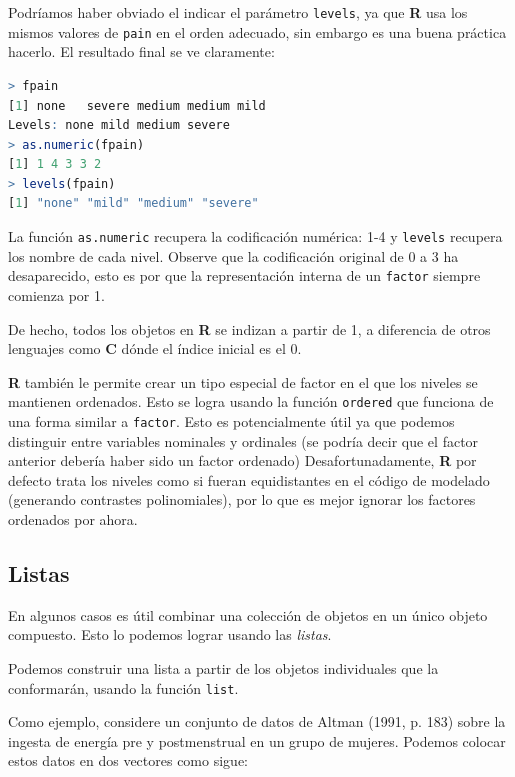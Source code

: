 Podríamos haber obviado el indicar el parámetro \texttt{levels}, ya que \textbf{R} usa
los mismos valores de \texttt{pain} en el orden adecuado, sin embargo es una buena
práctica hacerlo. El resultado final se ve claramente:

\begin{lstlisting}[language=R]
> fpain
[1] none   severe medium medium mild
Levels: none mild medium severe
> as.numeric(fpain)
[1] 1 4 3 3 2
> levels(fpain)
[1] "none" "mild" "medium" "severe"
\end{lstlisting}

La función \texttt{as.numeric} recupera la codificación numérica: 1-4 y
\texttt{levels} recupera los nombre de cada nivel. Observe que la codificación
original de 0 a 3 ha desaparecido, esto es por que la representación interna de
un \texttt{factor} siempre comienza por 1.

\begin{tradnote} De hecho, todos los objetos en \textbf{R} se indizan a partir de 1, a
diferencia de otros lenguajes como \textbf{C} dónde el índice inicial es el
0.\end{tradnote}

\textbf{R} también le permite crear un tipo especial de factor en el que los
niveles se mantienen ordenados.  Esto se logra usando la función
\texttt{ordered} que funciona de una forma similar a \texttt{factor}.  Esto es
potencialmente útil ya que podemos distinguir entre variables nominales y
ordinales (se podría decir que el factor anterior debería haber sido un factor
ordenado) Desafortunadamente, \textbf{R} por defecto trata los niveles como si
fueran equidistantes en el código de modelado (generando contrastes
polinomiales), por lo que es mejor ignorar los factores ordenados por ahora.

\subsection{Listas} \label{listas}

En algunos casos es útil combinar una colección de objetos en un único objeto
compuesto. Esto lo podemos lograr usando las \textit{listas}.

Podemos construir una lista a partir de los objetos individuales que la
conformarán, usando la función \texttt{list}.

Como ejemplo, considere un conjunto de datos de Altman (1991, p. 183) sobre la
ingesta de energía pre y postmenstrual en un grupo de mujeres. Podemos colocar
estos datos en dos vectores como sigue:

